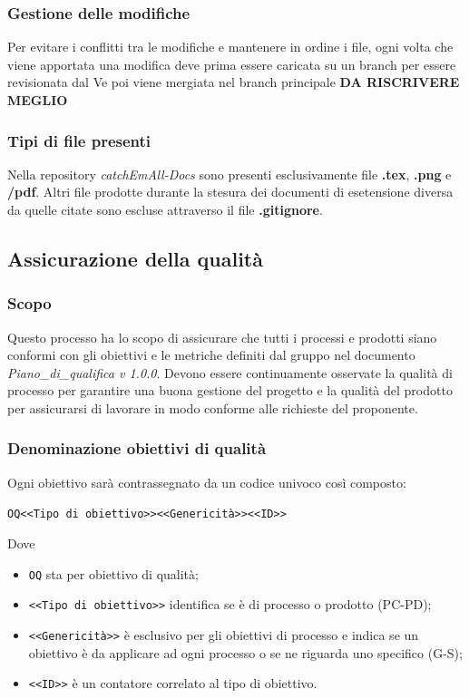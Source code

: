 \subsubsection{Gestione delle modifiche}
Per evitare i conflitti tra le modifiche e mantenere in ordine i file, ogni volta che viene apportata una modifica deve prima essere caricata su un branch per essere revisionata dal Ve poi viene mergiata nel branch principale \textbf{DA RISCRIVERE MEGLIO }

\subsubsection{Tipi di file presenti}
Nella repository \textit{catchEmAll-Docs} sono presenti esclusivamente file \textbf{.tex}, \textbf{.png} e \textbf{/pdf}. Altri file prodotte durante la stesura dei documenti di esetensione diversa da quelle citate sono escluse attraverso il file \textbf{.gitignore}.
\subsection{Assicurazione della qualità}
\subsubsection{Scopo}
Questo processo ha lo scopo di assicurare che tutti i processi e prodotti siano conformi con gli obiettivi e le metriche definiti dal gruppo nel documento \textit{Piano\_di\_qualifica v 1.0.0}. 
Devono essere continuamente osservate la qualità di processo per garantire una buona gestione del progetto e la qualità del prodotto per assicurarsi di lavorare in modo conforme alle richieste del proponente.
\subsubsection{Denominazione obiettivi di qualità}
Ogni obiettivo sarà contrassegnato da un codice univoco così composto:
\begin{center}
	\verb|OQ<<Tipo di obiettivo>><<Genericità>><<ID>>|
\end{center}
Dove 
\begin{itemize}
	\item \verb|OQ| sta per obiettivo di qualità;
	\item \verb|<<Tipo di obiettivo>>| identifica se è di processo o prodotto (PC-PD);
	\item \verb|<<Genericità>>| è esclusivo per gli obiettivi di processo e indica se un obiettivo è da applicare ad ogni processo o se ne riguarda uno specifico (G-S);
	\item \verb|<<ID>>| è un contatore correlato al tipo di obiettivo.
\end{itemize}
